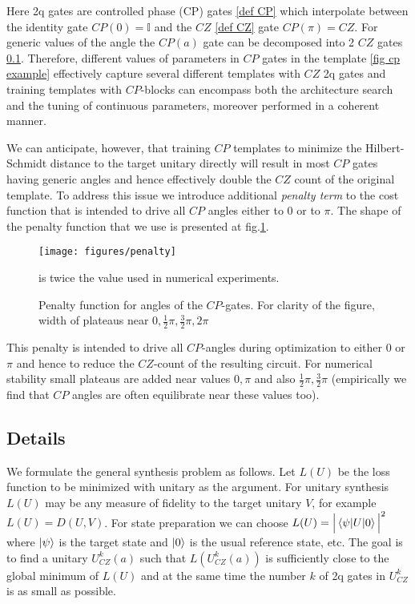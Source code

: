 \documentclass[amsfonts, amssymb, aps, nofootinbib]{revtex4-2}
\begin{document}
Here 2q gates are controlled phase (CP) gates \eqref{def CP} which interpolate between the identity gate $CP(0)=\mathbb{I}$ and the $CZ$ \eqref{def CZ} gate $CP(\pi)=CZ$. For generic values of the angle the $CP(a)$ gate can be decomposed into 2 $CZ$ gates \ref{}. Therefore, different values of parameters in $CP$ gates in the template \eqref{fig cp example} effectively capture several different templates with $CZ$ 2q gates and training templates with $CP$-blocks can encompass both the architecture search and the tuning of continuous parameters, moreover performed in a coherent manner.


We can anticipate, however, that training $CP$ templates to minimize the Hilbert-Schmidt distance to the target unitary directly will result in most $CP$ gates having generic angles and hence effectively double the $CZ$ count of the original template. To address this issue we introduce additional \textit{penalty term} to the cost function that is intended to drive all $CP$ angles either to $0$ or to $\pi$. The shape of the penalty function that we use is presented at fig.\ref{fig penalty}.
\begin{figure}[h!]
\texttt{[image: figures/penalty]}
\caption{Penalty function for angles of the $CP$-gates. For clarity of the figure, width of plateaus near $0,\frac12\pi, \frac32\pi, 2\pi$} is twice the value used in numerical experiments.
\label{fig penalty}
\end{figure}

This penalty is intended to drive all $CP$-angles during optimization to either $0$ or $\pi$ and hence to reduce the $CZ$-count of the resulting circuit. For numerical stability small plateaus are added near values $0,\pi$ and also $\frac12\pi, \frac32\pi$  (empirically we find that $CP$ angles are often equilibrate near these values too).

\subsection{Details}
We formulate the general synthesis problem as follows. Let $L(U)$ be the loss function to be minimized with unitary as the argument. For unitary synthesis $L(U)$ may be any measure of fidelity to the target unitary $V$, for example $L(U)=D(U, V)$. For state preparation we can choose $L(U) = \Big|\braket{\psi|U|0}\Big|^2$ where $\ket{\psi}$ is the target state and $\ket{0}$ is the usual reference state, etc. The goal is to find a unitary $U^k_{CZ}(a)$ such that $L(U^k_{CZ}(a))$ is sufficiently close to the global minimum of $L(U)$ and at the same time the number $k$ of 2q gates in $U^k_{CZ}$ is as small as possible. 
\end{document}
